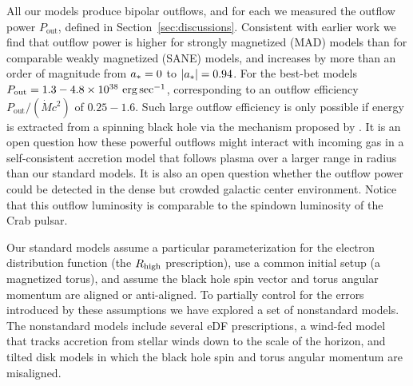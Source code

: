 All our models produce bipolar outflows, and for each we measured the outflow power $P_\mathrm{out}$, defined in Section~\ref{sec:discussions}. Consistent with earlier work we find that outflow power is higher for strongly magnetized (MAD) models than for comparable weakly magnetized (SANE) models, and increases by more than an order of magnitude from $a_* = 0$ to $|a_*| = 0.94$.  For the best-bet models $P_\mathrm{out} = 1.3-4.8 \times 10^{38}\,\,\mathrm{erg}\,\mathrm{sec}^{-1}$, corresponding to an outflow efficiency $P_\mathrm{out} /(\dot{M} c^2)$ of $0.25 - 1.6$.  Such large  outflow efficiency is only possible if energy is extracted from a spinning black hole via the mechanism proposed by  \cite{1977MNRAS.179..433B}.  It is an open question how these powerful outflows might interact with incoming gas in a self-consistent accretion model that follows plasma over a larger range in radius than our standard models.  It is also an open question whether the outflow power could be detected in the dense but crowded galactic center environment.  Notice that this outflow luminosity is comparable to the spindown luminosity of the Crab pulsar.

Our standard models assume a particular parameterization for the electron distribution function (the $R_\mathrm{high}$ prescription), use a common initial setup (a magnetized torus), and assume the black hole spin vector and torus angular momentum are aligned or anti-aligned.  To partially control for the errors introduced by these assumptions we have explored a set of nonstandard models.  The nonstandard models include several eDF prescriptions, a wind-fed model that tracks accretion from stellar winds down to the scale of the horizon, and tilted disk models in which the black hole spin and torus angular momentum are misaligned.

